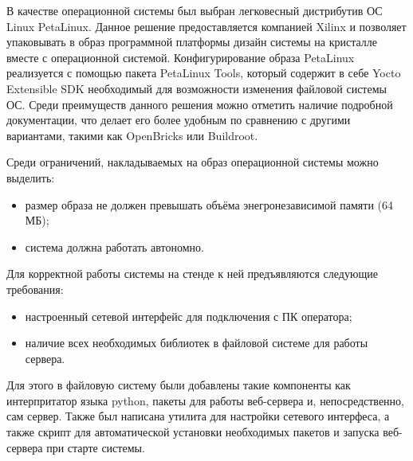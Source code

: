 В качестве операционной системы был выбран легковесный дистрибутив ОС Linux PetaLinux. Данное решение предоставляется компанией Xilinx и позволяет упаковывать в образ программной платформы дизайн системы на кристалле вместе с операционной системой. Конфигурирование образа PetaLinux реализуется с помощью пакета PetaLinux Tools, который содержит в себе Yocto Extensible SDK необходимый для возможности изменения файловой системы ОС. Среди преимуществ данного решения можно отметить наличие подробной документации, что делает его более удобным по сравнению с другими вариантами, такими как OpenBricks или Buildroot.\par
Среди ограничений, накладываемых на образ операционной системы можно выделить:\par
\begin{itemize}
    \item размер образа не должен превышать объёма энегронезависимой памяти (64 МБ);
    \item система должна работать автономно.
\end{itemize}\par
Для корректной работы системы на стенде к ней предъявляются следующие требования:\par
\begin{itemize}
    \item настроенный сетевой интерфейс для подключения с ПК оператора;
    \item наличие всех необходимых библиотек в файловой системе для работы сервера.
\end{itemize}\par
Для этого в файловую систему были добавлены такие компоненты как интерпритатор языка python, пакеты для работы веб-сервера и, непосредственно, сам сервер. Также был написана утилита для настройки сетевого интерфеса, а также скрипт для автоматической установки необходимых пакетов и запуска веб-сервера при старте системы.
